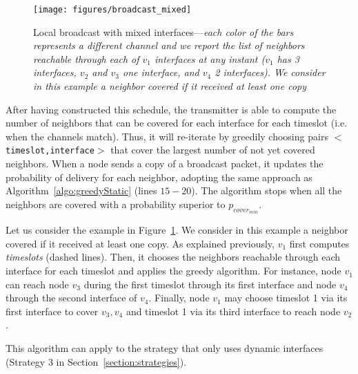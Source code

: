 \documentclass[twoside]{article}
\begin{document}
\begin{figure}[t!]
\begin{center}
	\texttt{[image: figures/broadcast\_mixed]}
	\caption{Local broadcast with mixed interfaces---\emph{each color of the bars represents a different channel and we report the list of neighbors reachable through each of $v_1$ interfaces at any instant ($v_1$ has 3 interfaces, $v_2$ and $v_3$ one interface, and $v_4$ 2 interfaces). We consider in this example a neighbor covered if it received at least one copy}}
 	\label{fig:broadcast}
	\end{center}
\end{figure}


After having constructed this schedule, the transmitter is able to compute the number of neighbors that can be covered for each interface for each timeslot (i.e. when the channels match).
Thus, it will re-iterate by greedily choosing pairs $<$\texttt{timeslot,interface}$>$ that cover the largest number of not yet covered neighbors. 
When a node sends a copy of a broadcast packet, it updates the probability of delivery for each neighbor, adopting the same approach as Algorithm~\ref{algo:greedyStatic} (lines $15-20$).
The algorithm stops when all the neighbors are covered with a probability superior to $p_{cover_{min}}$. 











Let us consider the example in Figure~\ref{fig:broadcast}.
We consider in this example a neighbor covered if it received at least one copy.
As explained previously, $v_1$ first computes \emph{timeslots} (dashed lines).
Then, it chooses the neighbors reachable through each interface for each timeslot and applies the greedy algorithm. 
For instance, node $v_1$ can reach node $v_3$ during the first timeslot through its first interface and node $v_4$ through the second interface of $v_4$.
Finally, node $v_1$ may choose timeslot 1 via its first interface to cover $v_3, v_4$ and timeslot 1 via its third interface to reach node $v_2$.

This algorithm can apply to the strategy that only uses dynamic interfaces (Strategy 3 in Section~\ref{section:strategies}). 
\end{document}
